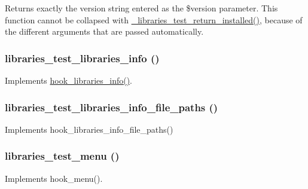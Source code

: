 Returns exactly the version string entered as the \$version parameter. This function cannot be collapsed with \hyperlink{libraries__test_8module_aa90217dd3a963d0d60b2f9c96c80813e}{\_\-libraries\_\-test\_\-return\_\-installed()}, because of the different arguments that are passed automatically. \hypertarget{libraries__test_8module_aa860ec3906a40f89fb93fd16fa00e13e}{
\subsubsection[{libraries\_\-test\_\-libraries\_\-info}]{\setlength{\rightskip}{0pt plus 5cm}libraries\_\-test\_\-libraries\_\-info ()}}
\label{libraries__test_8module_aa860ec3906a40f89fb93fd16fa00e13e}
Implements \hyperlink{libraries_8api_8php_abe57a1a01f1d2d134a9014258fe9e016}{hook\_\-libraries\_\-info()}. \hypertarget{libraries__test_8module_a303e0ac6030ebace3084c766fe0e6d04}{
\subsubsection[{libraries\_\-test\_\-libraries\_\-info\_\-file\_\-paths}]{\setlength{\rightskip}{0pt plus 5cm}libraries\_\-test\_\-libraries\_\-info\_\-file\_\-paths ()}}
\label{libraries__test_8module_a303e0ac6030ebace3084c766fe0e6d04}
Implements hook\_\-libraries\_\-info\_\-file\_\-paths() \hypertarget{libraries__test_8module_a9c8df89dd58a432de148610dcdc2a8d9}{
\subsubsection[{libraries\_\-test\_\-menu}]{\setlength{\rightskip}{0pt plus 5cm}libraries\_\-test\_\-menu ()}}
\label{libraries__test_8module_a9c8df89dd58a432de148610dcdc2a8d9}
Implements hook\_\-menu(). 